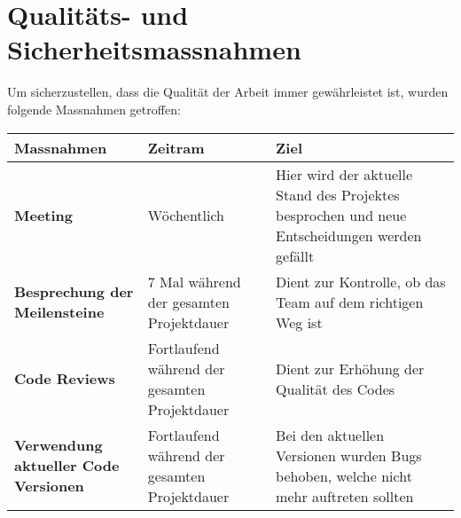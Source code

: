 \section{Qualitäts- und Sicherheitsmassnahmen}
Um sicherzustellen, dass die Qualität der Arbeit immer gewährleistet ist, wurden folgende Massnahmen getroffen:

\begin{center}
	\begin{tabular}{| m{3.5cm} | m{3.5cm} | m{3.5cm} |}
	\hline
	\textbf{Massnahmen} & \textbf{Zeitram} & \textbf{Ziel} \\
	\hline
	\textbf{Meeting} & Wöchentlich & Hier wird der aktuelle Stand des Projektes besprochen und neue Entscheidungen werden gefällt \\
	\hline
	\textbf{Besprechung der Meilensteine} & 7 Mal während der gesamten Projektdauer & Dient zur Kontrolle, ob das Team auf dem richtigen Weg ist \\
	\hline
	\textbf{Code Reviews} & Fortlaufend während der gesamten Projektdauer & Dient zur Erhöhung der Qualität des Codes \\
	\hline
	\textbf{Verwendung aktueller Code Versionen} & Fortlaufend während der gesamten Projektdauer & Bei den aktuellen Versionen wurden Bugs behoben, welche nicht mehr auftreten sollten \\
	\hline
	\end{tabular}
\end{center}


\newpage